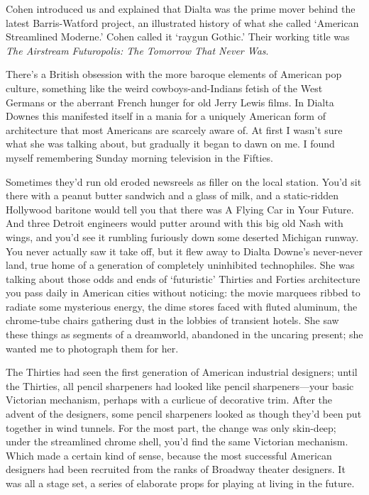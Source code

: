 Cohen introduced us and explained that Dialta was the prime mover behind the latest Barris-Watford project, an illustrated history of what she called `American Streamlined Moderne.' Cohen called it `raygun Gothic.' Their working title was \textit{The Airstream Futuropolis: The Tomorrow That Never Was}.

There's a British obsession with the more baroque elements of American pop culture, something like the weird cowboys-and-Indians fetish of the West Germans or the aberrant French hunger for old Jerry Lewis films. In Dialta Downes this manifested itself in a mania for a uniquely American form of architecture that most Americans are scarcely aware of. At first I wasn't sure what she was talking about, but gradually it began to dawn on me. I found myself remembering Sunday morning television in the Fifties.

Sometimes they'd run old eroded newsreels as filler on the local station. You'd sit there with a peanut butter sandwich and a glass of milk, and a static-ridden Hollywood baritone would tell you that there was A Flying Car in Your Future. And three Detroit engineers would putter around with this big old Nash with wings, and you'd see it rumbling furiously down some deserted Michigan runway. You never actually saw it take off, but it flew away to Dialta Downe's never-never land, true home of a generation of completely uninhibited technophiles. She was talking about those odds and ends of `futuristic' Thirties and Forties architecture you pass daily in American cities without noticing: the movie marquees ribbed to radiate some mysterious energy, the dime stores faced with fluted aluminum, the chrome-tube chairs gathering dust in the lobbies of transient hotels. She saw these things as segments of a dreamworld, abandoned in the uncaring present; she wanted me to photograph them for her.

The Thirties had seen the first generation of American industrial designers; until the Thirties, all pencil sharpeners had looked like pencil sharpeners---your basic Victorian mechanism, perhaps with a curlicue of decorative trim. After the advent of the designers, some pencil sharpeners looked as though they'd been put together in wind tunnels. For the most part, the change was only skin-deep; under the streamlined chrome shell, you'd find the same Victorian mechanism. Which made a certain kind of sense, because the most successful American designers had been recruited from the ranks of Broadway theater designers. It was all a stage set, a series of elaborate props for playing at living in the future.

